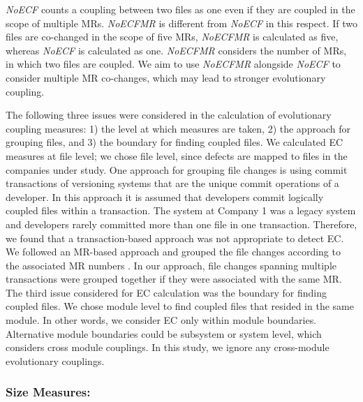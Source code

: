 \documentclass[times]{smrauth}
\begin{document}
%

\textit{NoECF} counts a coupling between two files as one even if they are coupled in the scope of multiple MRs. \textit{NoECFMR} is different from \textit{NoECF} in this respect. If two files are co-changed in the scope of five MRs, \textit{NoECFMR} is calculated as five, whereas \textit{NoECF} is calculated as one. \textit{NoECFMR} considers the number of MRs, in which two files are coupled. We aim to use \textit{NoECFMR} alongside \textit{NoECF} to consider multiple MR co-changes, which may lead to stronger evolutionary coupling.

The following three issues were considered in the calculation of evolutionary coupling measures: 1) the level at which measures are taken, 2) the approach for grouping files, and 3) the boundary for finding coupled files. We calculated EC measures at file level; we chose file level, since defects are mapped to files in the companies under study. One approach for grouping file changes is using commit transactions of versioning systems that are the unique commit operations of a developer. In this approach it is assumed that developers commit logically coupled files within a transaction. The system at Company 1 was a legacy system and developers rarely committed more than one file in one transaction. Therefore, we found that a transaction-based approach was not appropriate to detect EC. We followed an MR-based approach and grouped the file changes according to the associated MR numbers \cite{graves2000predicting}. In our approach, file changes spanning multiple transactions were grouped together if they were associated with the same MR. The third issue considered for EC calculation was the boundary for finding coupled files. We chose module level to find coupled files that resided in the same module. In other words, we consider EC only within module boundaries. Alternative module boundaries could be subsystem or system level, which considers cross module couplings. In this study, we ignore any cross-module evolutionary couplings. 


\subsubsection{Size Measures:}
\end{document}
